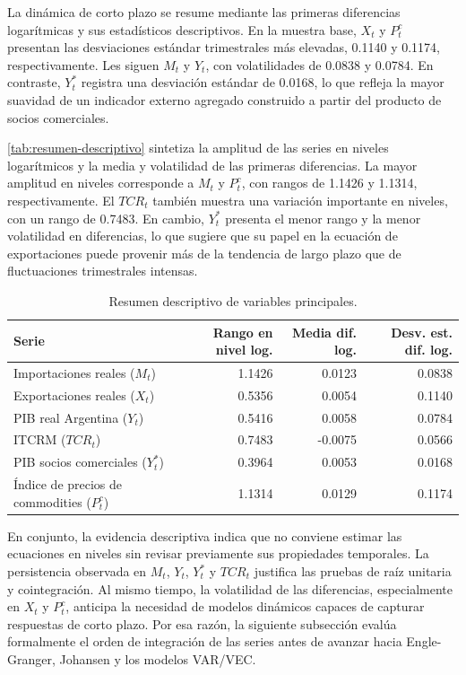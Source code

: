 \documentclass[11pt,a4paper]{article}
\begin{document}
	La dinámica de corto plazo se resume mediante las primeras diferencias
	logarítmicas y sus estadísticos descriptivos. En la muestra base, \(X_t\) y
	\(P_t^c\) presentan las desviaciones estándar trimestrales más elevadas, 0.1140
	y 0.1174, respectivamente. Les siguen \(M_t\) y \(Y_t\), con volatilidades de
	0.0838 y 0.0784. En contraste, \(Y_t^*\) registra una desviación estándar de
	0.0168, lo que refleja la mayor suavidad de un indicador externo agregado
	construido a partir del producto de socios comerciales.

	\autoref{tab:resumen-descriptivo} sintetiza la amplitud de las series en
	niveles logarítmicos y la media y volatilidad de las primeras diferencias. La
	mayor amplitud en niveles corresponde a \(M_t\) y \(P_t^c\), con rangos de
	1.1426 y 1.1314, respectivamente. El \(TCR_t\) también muestra una variación
	importante en niveles, con un rango de 0.7483. En cambio, \(Y_t^*\) presenta el
	menor rango y la menor volatilidad en diferencias, lo que sugiere que su papel
	en la ecuación de exportaciones puede provenir más de la tendencia de largo
	plazo que de fluctuaciones trimestrales intensas.

	\begin{table}[H]
		\centering
		\caption{Resumen descriptivo de variables principales.}
		\label{tab:resumen-descriptivo}
		\small
		\begin{tabular}{lrrr}
			\toprule
			Serie & Rango en nivel log. & Media dif. log. & Desv. est. dif. log. \\
			\midrule
			Importaciones reales (\(M_t\)) & 1.1426 & 0.0123 & 0.0838 \\
			Exportaciones reales (\(X_t\)) & 0.5356 & 0.0054 & 0.1140 \\
			PIB real Argentina (\(Y_t\)) & 0.5416 & 0.0058 & 0.0784 \\
			ITCRM (\(TCR_t\)) & 0.7483 & -0.0075 & 0.0566 \\
			PIB socios comerciales (\(Y_t^*\)) & 0.3964 & 0.0053 & 0.0168 \\
			Índice de precios de commodities (\(P_t^c\)) & 1.1314 & 0.0129 & 0.1174 \\
			\bottomrule
		\end{tabular}
	\end{table}

	En conjunto, la evidencia descriptiva indica que no conviene estimar las
	ecuaciones en niveles sin revisar previamente sus propiedades temporales. La
	persistencia observada en \(M_t\), \(Y_t\), \(Y_t^*\) y \(TCR_t\) justifica las
	pruebas de raíz unitaria y cointegración. Al mismo tiempo, la volatilidad de
	las diferencias, especialmente en \(X_t\) y \(P_t^c\), anticipa la necesidad de
	modelos dinámicos capaces de capturar respuestas de corto plazo. Por esa razón,
	la siguiente subsección evalúa formalmente el orden de integración de las
	series antes de avanzar hacia Engle-Granger, Johansen y los modelos VAR/VEC.
\end{document}
